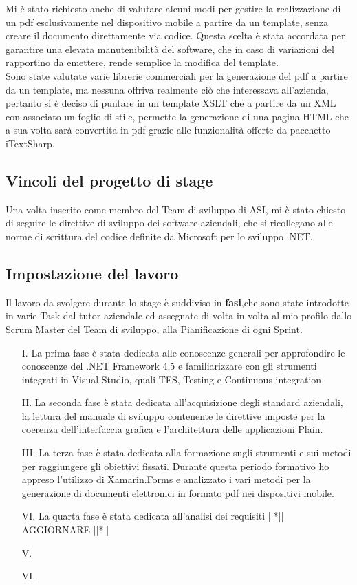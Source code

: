 Mi è stato richiesto anche di valutare alcuni modi per gestire la realizzazione di un pdf esclusivamente nel dispositivo mobile a partire da un template, senza creare il documento direttamente via codice. Questa scelta è stata accordata per garantire una elevata manutenibilità del software, che in caso di variazioni del rapportino da emettere, rende semplice la modifica del template.
\\
Sono state valutate varie librerie commerciali per la generazione del pdf a partire da un template, ma nessuna offriva realmente ciò che interessava all'azienda, pertanto si è deciso di puntare in un template XSLT che a partire da un XML con associato un foglio di stile, permette la generazione di una pagina HTML che a sua volta sarà convertita in pdf grazie alle funzionalità offerte da pacchetto iTextSharp.

\subsection{Vincoli del progetto di stage}
Una volta inserito come membro del Team di sviluppo di ASI, mi è stato chiesto di seguire le direttive di sviluppo dei software aziendali, che si ricollegano alle norme di scrittura del codice definite da Microsoft per lo sviluppo .NET.

\subsection{Impostazione del lavoro}
Il lavoro da svolgere durante lo stage è suddiviso in \textbf{fasi},che sono state introdotte in varie Task dal tutor aziendale ed assegnate di volta in volta al mio profilo dallo Scrum Master del Team di sviluppo, alla Pianificazione di ogni Sprint.
\begin{itemize}
	\item[I.] La prima fase è stata dedicata alle conoscenze generali per approfondire le conoscenze del .NET Framework 4.5 e familiarizzare con gli strumenti integrati in Visual Studio, quali TFS, Testing e Continuous integration.
	\item[II.] La seconda fase è stata dedicata all'acquisizione degli standard aziendali, la lettura del manuale di sviluppo contenente le direttive imposte per la coerenza dell'interfaccia grafica e l'architettura delle applicazioni Plain.
	\item[III.] La terza fase è stata dedicata alla formazione sugli strumenti e sui metodi per raggiungere gli obiettivi fissati. Durante questa periodo formativo ho appreso l'utilizzo di Xamarin.Forms e analizzato i vari metodi per la generazione di documenti elettronici in formato pdf nei dispositivi mobile.
	\item[VI.] La quarta fase è stata dedicata all'analisi dei requisiti ||*|| AGGIORNARE ||*||
	\item[V.]
	\item[VI.]
\end{itemize}









